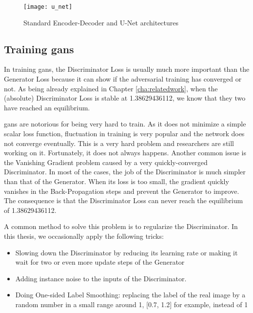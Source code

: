 \begin{figure}[h]
	\centering
	\texttt{[image: u\_net]}
	\caption{Standard Encoder-Decoder and U-Net architectures}
	\label{fig:u_net}
\end{figure}

\subsection{Training \acrshort{gan}s}
\label{sub:training_gan}

In training \acrshort{gan}s, the Discriminator Loss is usually much more important than
the Generator Loss because it can show if the adversarial training has converged or
not. As being already explained in Chapter \ref{cha:relatedwork}, when the (absolute) Discriminator
Loss is stable at 1.38629436112, we know that they two have reached an equilibrium. 

\acrshort{gan}s are notorious for being very hard to train. As it does not minimize a
simple scalar loss function, fluctuation in training is very popular and the network does
not converge eventually. This is a very hard problem and researchers are still working on
it. Fortunately, it does not always happens. Another common issue is the
Vanishing Gradient problem caused by a very quickly-converged Discriminator. In most of
the cases, the job of the Discriminator is much simpler than that of the Generator. When
its loss is too small, the gradient quickly vanishes in the Back-Propagation steps and
prevent the Generator to improve. The consequence is that the Discriminator Loss can never
reach the equilibrium of 1.38629436112.

A common method to solve this problem is to regularize the Discriminator. In this thesis, we
occasionally apply the following tricks:

\begin{itemize}
	\item Slowing down the Discriminator by reducing its learning rate or making it wait
		for two or even more update steps of the Generator
	\item Adding instance noise to the inputs of the Discriminator. \cite{kaae}
	\item Doing One-sided Label Smoothing: replacing the label of the real image
		by a random number in a small range around 1, [0.7, 1.2] for example, instead of 1
		\cite{saliman}
\end{itemize}

